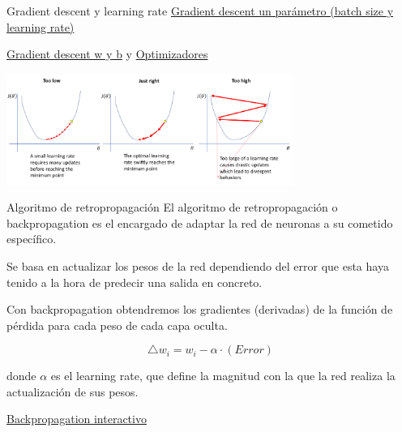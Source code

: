 \begin{frame}{Gradient descent y learning rate}
\href{https://www.deeplearning.ai/ai-notes/optimization/index.html\#learning-rate}{Gradient descent un parámetro (batch size y learning rate)}

\href{https://www.deeplearning.ai/ai-notes/optimization/index.html\#adjusting-gradient-descent-hyperparameters}{Gradient descent w y b} y \href{https://www.deeplearning.ai/ai-notes/optimization/index.html\#iterative-update}{Optimizadores}

\centering
\includegraphics[width=0.7\textwidth]{Slides/figures/Introduccion/lr.png}

\end{frame}

\begin{frame}{Algoritmo de retropropagación}
El algoritmo de \alert{retropropagación} o \alert{backpropagation} es el encargado de \alert{adaptar} la red de neuronas a su cometido específico.

Se basa en actualizar los \alert{pesos} de la red dependiendo del \alert{error} que esta haya tenido a la hora de predecir una \alert{salida} en concreto.

Con backpropagation obtendremos los \alert{gradientes (derivadas)} de la función de pérdida
para cada \alert{peso} de cada \alert{capa oculta}.

\begin{equation}
    \bigtriangleup w_i = w_i - \alpha \cdot (Error)
\end{equation}

donde $\alpha$ es el \alert{learning rate}, que define la \alert{magnitud} con la que la red realiza la \alert{actualización} de sus pesos.

\href{https://xnought.github.io/backprop-explainer/}{Backpropagation interactivo}

\end{frame}


